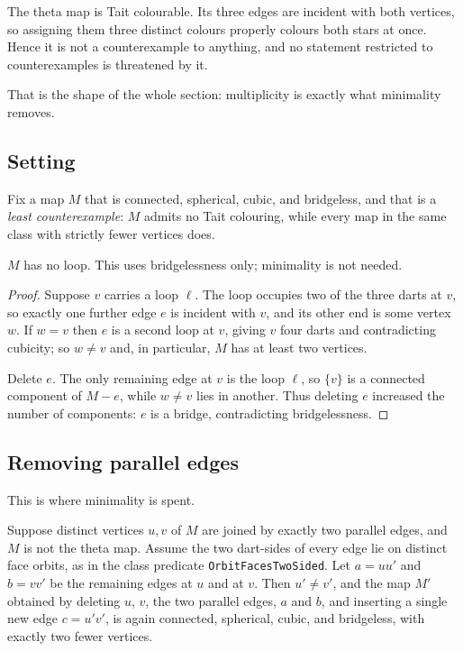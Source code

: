 \begin{remark}\label{rem:theta-colourable}
\Sprose
The theta map is Tait colourable. Its three edges are incident with both
vertices, so assigning them three distinct colours properly colours both
stars at once. Hence it is not a counterexample to anything, and no
statement restricted to counterexamples is threatened by it.
\end{remark}

That is the shape of the whole section: multiplicity is exactly what
minimality removes.

\subsection{Setting}

Fix a map $M$ that is connected, spherical, cubic, and bridgeless, and that
is a \emph{least counterexample}: $M$ admits no Tait colouring, while every
map in the same class with strictly fewer vertices does.

\begin{lemma}[no loops]\label{lem:no-loops}
\Sprose
$M$ has no loop. This uses bridgelessness only; minimality is not needed.
\end{lemma}

\begin{proof}
Suppose $v$ carries a loop $\ell$. The loop occupies two of the three darts
at $v$, so exactly one further edge $e$ is incident with $v$, and its other
end is some vertex $w$. If $w = v$ then $e$ is a second loop at $v$, giving
$v$ four darts and contradicting cubicity; so $w \neq v$ and, in
particular, $M$ has at least two vertices.

Delete $e$. The only remaining edge at $v$ is the loop $\ell$, so $\{v\}$ is
a connected component of $M - e$, while $w \neq v$ lies in another. Thus
deleting $e$ increased the number of components: $e$ is a bridge,
contradicting bridgelessness.
\end{proof}

\subsection{Removing parallel edges}

This is where minimality is spent.

\begin{lemma}\label{lem:digon-splice}
Suppose distinct vertices $u, v$ of $M$ are joined by exactly two parallel
edges, and $M$ is not the theta map.
Assume the two dart-sides of every edge lie on distinct face orbits, as in
the class predicate \texttt{OrbitFacesTwoSided}.
Let $a = uu'$ and $b = vv'$ be the remaining edges at $u$ and at $v$. Then
$u' \neq v'$, and the map $M'$ obtained by deleting $u$, $v$, the two
parallel edges, $a$ and $b$, and inserting a single new edge $c = u'v'$, is
again connected, spherical, cubic, and bridgeless, with exactly two fewer
vertices.
\end{lemma}

